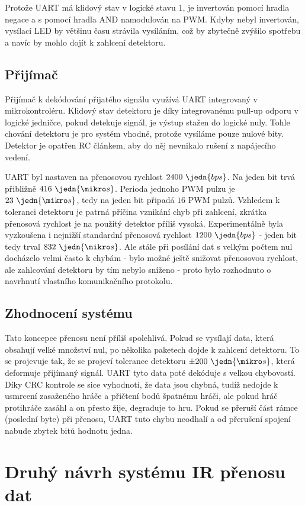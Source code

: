 Protože UART má klidový stav v logické stavu 1, je invertován pomocí hradla negace a s pomocí hradla AND namodulován na PWM. Kdyby nebyl invertován, vysílací LED by většinu času strávila vysíláním, což by zbytečně zvýšilo spotřebu a navíc by mohlo dojít k zahlcení detektoru.

\subsection{Přijímač}
Přijímač k dekódování přijatého signálu využívá UART integrovaný v mikrokontroléru. Klidový stav detektoru je díky integrovanému pull-up odporu v logické jedničce, pokud detekuje signál, je výstup stažen do logické nuly. Tohle chování detektoru je pro systém vhodné, protože vysíláme pouze nulové bity. Detektor je opatřen RC článkem, aby do něj nevnikalo rušení z napájecího vedení.

UART byl nastaven na přenosovou rychlost $2400~\jedn{bps}$. Na jeden bit trvá přibližně $416~\jedn{\mikro s}$. Perioda jednoho PWM pulzu je $23~\jedn{\mikro s}$, tedy na jeden bit připadá $16$ PWM pulzů. Vzhledem k toleranci detektoru je patrná příčina vznikání chyb při zahlcení, zkrátka přenosová rychlost je na použitý detektor příliš vysoká. Experimentálně byla vyzkoušena i nejnižší standardní přenosová rychlost $1200~\jedn{bps}$ - jeden bit tedy trval $832~\jedn{\mikro s}$. Ale stále při posílání dat s velkým počtem nul docházelo velmi často k chybám - bylo možné ještě snižovat přenosovou rychlost, ale zahlcování detektoru by tím nebylo sníženo - proto bylo rozhodnuto o navrhnutí vlastního komunikačního protokolu.

\subsection{Zhodnocení systému}
Tato koncepce přenosu není příliš spolehlivá. Pokud se vysílají data, která obsahují velké množství nul, po několika paketech dojde k zahlcení detektoru. To se projevuje tak, že se projeví tolerance detektoru $\pm200~\jedn{\mikro s}$, která deformuje přijímaný signál. UART tyto data poté dekóduje s velkou chybovostí. Díky CRC kontrole se sice vyhodnotí, že data jsou chybná, tudíž nedojde k usmrcení zasaženého hráče a přičtení bodů špatnému hráči, ale pokud hráč protihráče zasáhl a on přesto žije, degraduje to hru. Pokud se přeruší část rámce (poslední byte) při přenosu, UART tuto chybu neodhalí a od přerušení spojení nabude zbytek bitů hodnotu jedna.

\section{Druhý návrh systému IR přenosu dat}

